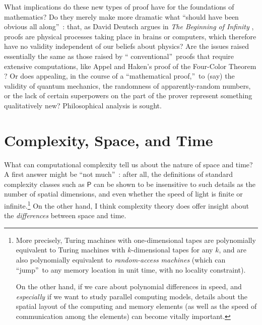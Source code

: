 \documentclass[12pt,onecolumn]{article}%
\begin{document}
What implications do these new types of proof have for the foundations of
mathematics? Do they merely make more dramatic what \textquotedblleft should
have been obvious all along\textquotedblright\ : that, as David Deutsch argues
in \textit{The Beginning of Infinity} \cite{deutsch:infinity}, proofs are
physical processes taking place in brains or computers, which therefore have
no validity independent of our beliefs about physics? Are the issues raised
essentially the same as those raised by \textquotedblleft
conventional\textquotedblright\  proofs that require extensive computations,
like Appel and Haken's proof of the Four-Color Theorem \cite{appelhaken}? Or
does appealing, in the course of a \textquotedblleft mathematical
proof,\textquotedblright\  to (say) the validity of quantum mechanics, the
randomness of apparently-random numbers, or the lack of certain superpowers on
the part of the prover represent something qualitatively new? Philosophical
analysis is sought.

\section{Complexity, Space, and Time\label{TIME}}

What can computational complexity tell us about the nature of space and time?
 A first answer might be \textquotedblleft not much\textquotedblright\ : after
all, the definitions of standard complexity classes such as $\mathsf{P}$ can
be shown to be insensitive to such details as the number of spatial
dimensions, and even whether the speed of light is finite or
infinite.\footnote{More precisely, Turing machines with one-dimensional tapes
are polynomially equivalent to Turing machines with $k$-dimensional tapes for
any $k$, and are also polynomially equivalent to \textit{random-access
machines} (which can \textquotedblleft jump\textquotedblright\  to any memory
location in unit time, with no locality constraint).
\par
On the other hand, if we care about polynomial differences in speed, and
\textit{especially} if we want to study parallel computing models, details
about the spatial layout of the computing and memory elements (as well as the
speed of communication among the elements) can become vitally important.} On
the other hand, I think complexity theory does offer insight about the
\textit{differences} between space and time.
\end{document}
